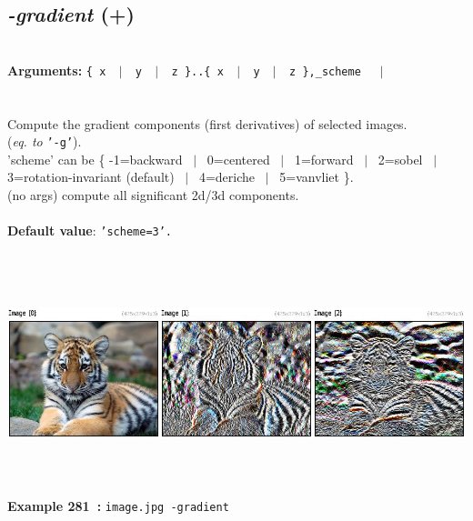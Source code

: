 \documentclass[a4paper,11pt,twoside]{book}
\begin{document}
\subsection{\emph{-gradient} (+)}\vspace*{-0.5em}
~\\\textbf{Arguments: } 
{\small \texttt{\{ x ~$|$~ y ~$|$~ z \}..\{ x ~$|$~ y ~$|$~ z \},\_scheme}}~~~$|$\\
\\~\\
Compute the gradient components (first derivatives) of selected images.
~\\(\emph{eq. to} {\small \texttt{'-g'}}).
~\\'scheme' can be \{ -1=backward ~$|$~ 0=centered ~$|$~ 1=forward ~$|$~ 2=sobel ~$|$~ 3=rotation-invariant (default) ~$|$~ 4=deriche ~$|$~ 5=vanvliet \}.
~\\(no args) compute all significant 2d/3d components.
~\\~\\\textbf{Default value}: {\small \texttt{'scheme=3'.}}
\begin{center}\includegraphics[keepaspectratio=true,height=7cm,width=\textwidth]{img/gmic_def281.jpg}\\
{\footnotesize \textbf{Example 281~:} \texttt{image.jpg -gradient}}
\end{center}
\end{document}
